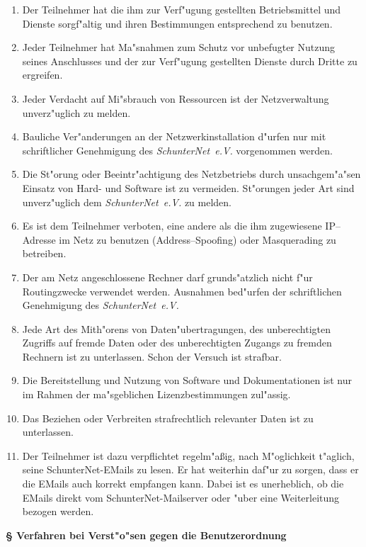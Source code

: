 \documentclass[12pt,titlepage,twoside]{scrartcl}
\newcounter{para_nr}
\newcommand{\Paragraph}[1]{{\large\bf\S{}\sf\textbf{\/\stepcounter{para_nr}\arabic{para_nr} #1}}}
\newcommand{\snev}{\emph{SchunterNet~e.V.} }
\begin{document}
\begin{appendix}
\begin{enumerate}
  \item Der Teilnehmer hat die ihm zur Verf"ugung gestellten Betriebsmittel
      und Dienste sorgf"altig und ihren Bestimmungen entsprechend zu benutzen.
  \item Jeder Teilnehmer hat Ma"snahmen zum Schutz vor
      unbefugter Nutzung seines Anschlusses und der zur Verf"ugung gestellten
      Dienste durch Dritte zu ergreifen.
  \item Jeder Verdacht auf Mi"sbrauch von Ressourcen ist der Netzverwaltung
      unverz"uglich zu melden.
  \item Bauliche Ver"anderungen an der Netzwerkinstallation d"urfen nur mit
      schriftlicher Genehmigung des \snev vorgenommen werden.
  \item Die St"orung oder Beeintr"achtigung des Netzbetriebs durch unsachgem"a"sen
      Einsatz von Hard- und Software ist zu vermeiden. St"orungen jeder Art
      sind unverz"uglich dem \snev zu melden.
  \item Es ist dem Teilnehmer verboten,  eine andere als die ihm zugewiesene
      IP--Adresse im Netz zu benutzen (Address--Spoofing) oder Masquerading zu
      betreiben.
  \item Der am Netz angeschlossene Rechner darf grunds"atzlich nicht f"ur
      Routingzwecke verwendet werden. Ausnahmen bed"urfen der schriftlichen
      Genehmigung des \snev
  \item Jede Art des Mith"orens von Daten"ubertragungen, des unberechtigten
      Zugriffs auf fremde Daten oder des unberechtigten Zugangs zu fremden
      Rechnern ist zu unterlassen. Schon der Versuch ist strafbar.
  \item Die Bereitstellung und Nutzung von Software und Dokumentationen ist
      nur im Rahmen der ma"sgeblichen Lizenzbestimmungen zul"assig.
  \item Das Beziehen oder Verbreiten strafrechtlich relevanter Daten ist zu
      unterlassen.
  \item Der Teilnehmer ist dazu verpflichtet regelm"a\ss ig, nach M"oglichkeit
      t"aglich,  seine SchunterNet-EMails zu lesen. Er hat weiterhin daf"ur zu
      sorgen,  dass  er die EMails auch korrekt empfangen kann. Dabei ist es
      unerheblich, ob die EMails direkt vom SchunterNet-Mailserver oder "uber
      eine Weiterleitung bezogen werden.
\end{enumerate}

\Paragraph{Verfahren bei Verst"o"sen gegen die Benutzerordnung}


\end{appendix}
\end{document}

